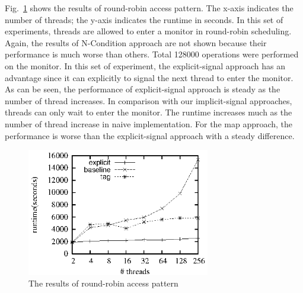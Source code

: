 \documentclass[preprint]{sigplanconf}
\begin{document}
%
Fig.~\ref{fig:rr_eval} shows the results of round-robin access pattern. The
x-axis indicates the number of threads; the y-axis indicates the
runtime in seconds. In this set of experiments, threads are allowed to enter a
monitor in round-robin scheduling. Again, the results of N-Condition approach
are not shown because their performance is much worse than others. Total 
128000 operations were performed on the monitor. In this set
of experiment, the explicit-signal approach has an advantage since it can
explicitly to signal the next thread to enter the monitor. As can be seen, the
performance of explicit-signal approach is steady as the number of thread
increases. In comparison with our implicit-signal approaches, threads can only 
wait to enter the monitor. The runtime increases much as the number of thread 
increase in naive implementation. For the map approach, the performance is 
worse than the explicit-signal approach with a steady difference. 

\begin{figure}[ht!]
  \centering
  \includegraphics[width=80mm]{fig/rr.eps}
  \caption{The results of round-robin access pattern}
  \label{fig:rr_eval}
\end{figure}
\end{document}
